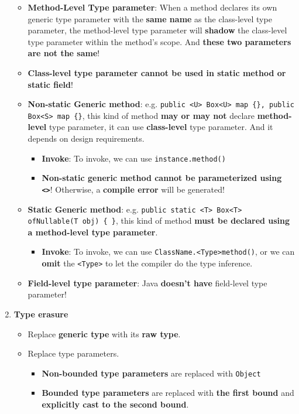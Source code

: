 \documentclass[10pt, landscape]{article}
\begin{document}
\begin{multicols}{4}
\begin{enumerate}
\begin{itemize}
        \item \textbf{Method-Level Type parameter}: When a method declares its own generic type parameter with the \textbf{same name} as the class-level type parameter, the method-level type parameter will \textbf{shadow} the class-level type parameter within the method's scope. And \textbf{these two parameters are not the same}!
        \item \textbf{Class-level type parameter cannot be used in static method or static field}!
        \item \textbf{Non-static Generic method}: e.g. \texttt{public <U> Box<U> map \{\}, public Box<S> map \{\}}, this kind of method \textbf{may or may not} declare \textbf{method-level} type parameter, it can use \textbf{class-level} type parameter. And it depends on design requirements.
        \begin{itemize}
            \item \textbf{Invoke}: To invoke, we can use \texttt{instance.method()}
            \item \textbf{Non-static generic method cannot be parameterized using \texttt{<>}}! Otherwise, a \textbf{compile error} will be generated!
        \end{itemize}
        \item \textbf{Static Generic method}: e.g. \texttt{public static <T> Box<T> ofNullable(T obj) \{ \}}, this kind of method \textbf{must be declared using a method-level type parameter}.
        \begin{itemize}
            \item \textbf{Invoke}: To invoke, we can use \texttt{ClassName.<Type>method()}, or we can \textbf{omit} the \texttt{<Type>} to let the compiler do the type inference.
        \end{itemize}
        \item \textbf{Field-level type parameter}: Java \textbf{doesn't have} field-level type parameter!
    \end{itemize}
    \item \textbf{Type erasure}
    \begin{itemize}
        \item Replace \textbf{generic type} with its \textbf{raw type}.
        \item Replace type parameters.
        \begin{itemize}
            \item \textbf{Non-bounded type parameters} are replaced with \texttt{Object}
            \item \textbf{Bounded type parameters} are replaced with \textbf{the first bound} and \textbf{explicitly cast to the second bound}.

\end{itemize}
\end{itemize}
\end{enumerate}
\end{multicols}
\end{document}
